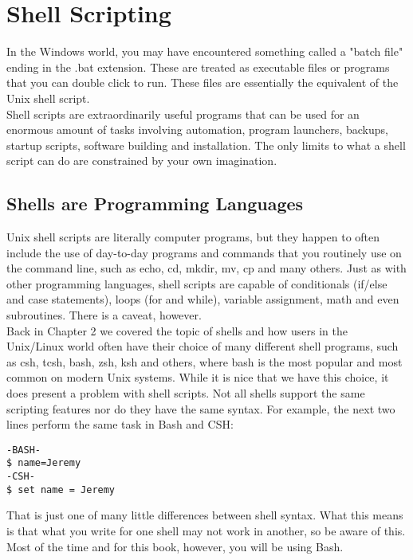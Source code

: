 \chapter{Shell Scripting}

In the Windows world, you may have encountered something called a "batch file" ending in the .bat extension.  These are treated as executable files or programs that you can double click to run.  These files are essentially the equivalent of the Unix shell script.\\

Shell scripts are extraordinarily useful programs that can be used for an enormous amount of tasks involving automation, program launchers, backups, startup scripts, software building and installation.  The only limits to what a shell script can do are constrained by your own imagination.

\section{Shells are Programming Languages}

Unix shell scripts are literally computer programs, but they happen to often include the use of day-to-day programs and commands that you routinely use on the command line, such as echo, cd, mkdir, mv, cp and many others.  Just as with other programming languages, shell scripts are capable of conditionals (if/else and case statements), loops (for and while), variable assignment, math and even subroutines.  There is a caveat, however.\\

Back in Chapter 2 we covered the topic of shells and how users in the Unix/Linux world often have their choice of many different shell programs, such as csh, tcsh, bash, zsh, ksh and others, where bash is the most popular and most common on modern Unix systems.  While it is nice that we have this choice, it does present a problem with shell scripts.  Not all shells support the same scripting features nor do they have the same syntax.  For example, the next two lines perform the same task in Bash and CSH:

\begin{verbatim}
-BASH-
$ name=Jeremy
-CSH-
$ set name = Jeremy
\end{verbatim}

That is just one of many little differences between shell syntax.  What this means is that what you write for one shell may not work in another, so be aware of this.  Most of the time and for this book, however, you will be using Bash.

